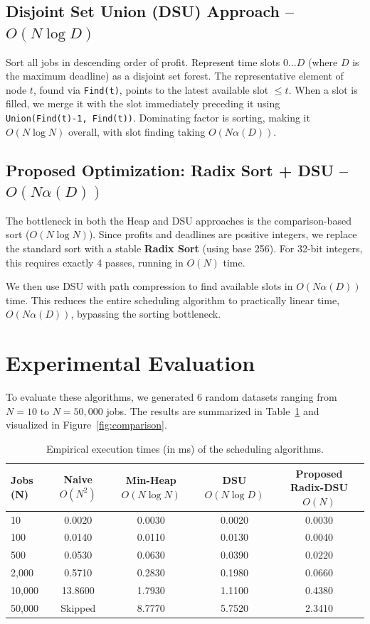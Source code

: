 \documentclass[11pt,a4paper]{article}
\begin{document}
\subsection{Disjoint Set Union (DSU) Approach -- $O(N \log D)$}
Sort all jobs in descending order of profit. Represent time slots $0 \dots D$ (where $D$ is the maximum deadline) as a disjoint set forest. The representative element of node $t$, found via \texttt{Find(t)}, points to the latest available slot $\le t$. When a slot is filled, we merge it with the slot immediately preceding it using \texttt{Union(Find(t)-1, Find(t))}. Dominating factor is sorting, making it $O(N \log N)$ overall, with slot finding taking $O(N \alpha(D))$.

\subsection{Proposed Optimization: Radix Sort + DSU -- $O(N \alpha(D))$}
The bottleneck in both the Heap and DSU approaches is the comparison-based sort ($O(N \log N)$). Since profits and deadlines are positive integers, we replace the standard sort with a stable \textbf{Radix Sort} (using base 256). For 32-bit integers, this requires exactly 4 passes, running in $O(N)$ time.

We then use DSU with path compression to find available slots in $O(N \alpha(D))$ time.
This reduces the entire scheduling algorithm to practically linear time, $O(N \alpha(D))$, bypassing the sorting bottleneck.

\section{Experimental Evaluation}
To evaluate these algorithms, we generated 6 random datasets ranging from $N = 10$ to $N = 50,000$ jobs. The results are summarized in Table~\ref{tab:benchmarks} and visualized in Figure~\ref{fig:comparison}.

\begin{table}[h]
\centering
\caption{Empirical execution times (in ms) of the scheduling algorithms.}
\label{tab:benchmarks}
\begin{tabular}{lcccc}
\toprule
\textbf{Jobs (N)} & \textbf{Naive $O(N^2)$} & \textbf{Min-Heap $O(N \log N)$} & \textbf{DSU $O(N \log D)$} & \textbf{Proposed Radix-DSU $O(N)$} \\
\midrule
10     & 0.0020 & 0.0030 & 0.0020 & 0.0030 \\
100    & 0.0140 & 0.0110 & 0.0130 & 0.0040 \\
500    & 0.0530 & 0.0630 & 0.0390 & 0.0220 \\
2,000  & 0.5710 & 0.2830 & 0.1980 & 0.0660 \\
10,000 & 13.8600 & 1.7930 & 1.1100 & 0.4380 \\
50,000 & Skipped & 8.7770 & 5.7520 & 2.3410 \\
\bottomrule
\end{tabular}
\end{table}
\end{document}
